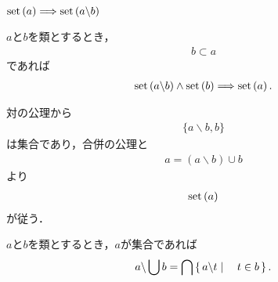 	$\operatorname*{set} \left(a\right) \Longrightarrow \operatorname*{set} \left(a \backslash b\right)$
	
	\begin{screen}
		\begin{thm}
			$a$と$b$を類とするとき，
			\begin{align}
				b \subset a
			\end{align}
			であれば
			\begin{align}
				\operatorname*{set} \left(a \backslash b\right) \wedge \operatorname*{set} \left(b\right) \Longrightarrow \operatorname*{set} \left(a\right).
			\end{align}
		\end{thm}
	\end{screen}
	
	\begin{sketch}
		対の公理から
		\begin{align}
			\{a \backslash b,b\}
		\end{align}
		は集合であり，合併の公理と
		\begin{align}
			a = (a \backslash b) \cup b
		\end{align}
		より
		\begin{align}
			\operatorname*{set} \left(a\right)
		\end{align}
		が従う．
		\QED
	\end{sketch}
	
	\begin{screen}
		\begin{thm}[合併を引いた類は要素の差の交叉で書ける]
		\label{thm:difference_of_union_is_intersection_of_differences_of_elements}
			$a$と$b$を類とするとき，$a$が集合であれば
			\begin{align}
				a \backslash \bigcup b = \bigcap \left\{\, a \backslash t \mid \quad t \in b\, \right\}.
			\end{align}
		\end{thm}
	\end{screen}
	
	
